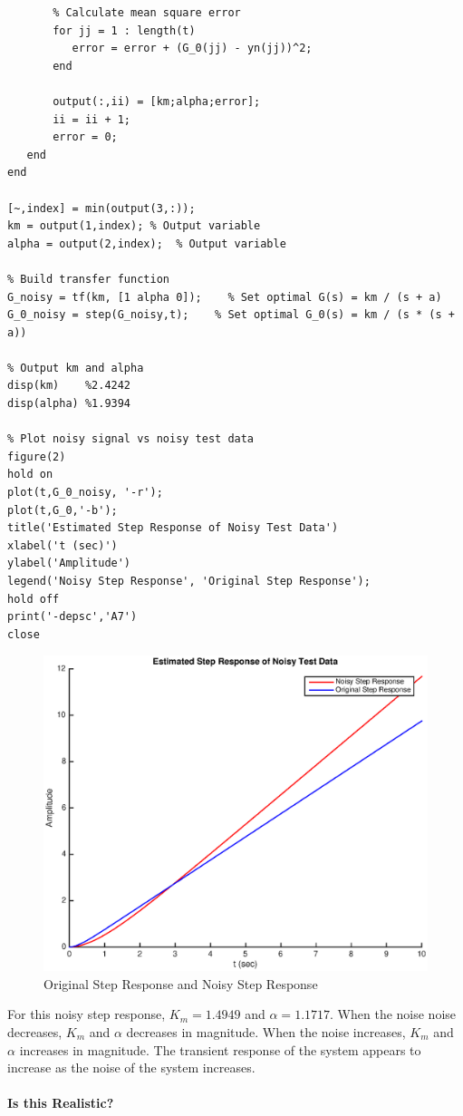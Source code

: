 \documentclass[11pt,a4paper]{article}
\begin{document}
\begin{enumerate}
\begin{lstlisting}
       % Calculate mean square error
       for jj = 1 : length(t)
          error = error + (G_0(jj) - yn(jj))^2;
       end
       
       output(:,ii) = [km;alpha;error];
       ii = ii + 1;
       error = 0;
   end
end

[~,index] = min(output(3,:));
km = output(1,index); % Output variable
alpha = output(2,index);  % Output variable

% Build transfer function
G_noisy = tf(km, [1 alpha 0]);    % Set optimal G(s) = km / (s + a)   
G_0_noisy = step(G_noisy,t);    % Set optimal G_0(s) = km / (s * (s + a))

% Output km and alpha
disp(km)    %2.4242
disp(alpha) %1.9394

% Plot noisy signal vs noisy test data
figure(2)
hold on
plot(t,G_0_noisy, '-r');
plot(t,G_0,'-b');
title('Estimated Step Response of Noisy Test Data')
xlabel('t (sec)')
ylabel('Amplitude')
legend('Noisy Step Response', 'Original Step Response');
hold off
print('-depsc','A7')
close
	\end{lstlisting}
	\begin{figure}[H]
	\centering
	\includegraphics[width=.8\textwidth]{PreDec/A7.eps}
	\caption{\label{fig:rand}Original Step Response and Noisy Step Response}
	\end{figure}
	For this noisy step response, $K_m = 1.4949$ and $\alpha = 1.1717$. When the noise noise decreases, $K_m$ and $\alpha$ decreases in magnitude. When the noise increases, $K_m$ and $\alpha$ increases in magnitude. The transient response of the system appears to increase as the noise of the system increases.\\\\
	\textbf{Is this Realistic?}\\\\

\end{enumerate}
\end{document}
